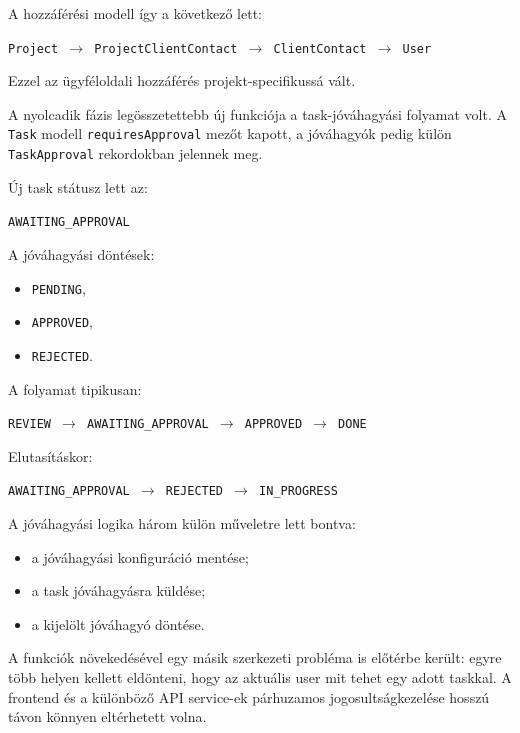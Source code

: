 \documentclass[11pt,a4paper]{report}
\begin{document}
    A hozzáférési modell így a következő lett:

    \begin{center}
        \texttt{Project $\rightarrow$ ProjectClientContact
            $\rightarrow$ ClientContact $\rightarrow$ User}
    \end{center}

    Ezzel az ügyféloldali hozzáférés projekt-specifikussá vált.

    A nyolcadik fázis legösszetettebb új funkciója a task-jóváhagyási folyamat
    volt. A \texttt{Task} modell \texttt{requiresApproval} mezőt kapott, a
    jóváhagyók pedig külön \texttt{TaskApproval} rekordokban jelennek meg.

    Új task státusz lett az:
    \begin{center}
        \texttt{AWAITING\_APPROVAL}
    \end{center}

    A jóváhagyási döntések:
    \begin{itemize}
        \item \texttt{PENDING},
        \item \texttt{APPROVED},
        \item \texttt{REJECTED}.
    \end{itemize}

    A folyamat tipikusan:
    \begin{center}
        \texttt{REVIEW $\rightarrow$ AWAITING\_APPROVAL
            $\rightarrow$ APPROVED $\rightarrow$ DONE}
    \end{center}

    Elutasításkor:
    \begin{center}
        \texttt{AWAITING\_APPROVAL $\rightarrow$ REJECTED
            $\rightarrow$ IN\_PROGRESS}
    \end{center}

    A jóváhagyási logika három külön műveletre lett bontva:
    \begin{itemize}
        \item a jóváhagyási konfiguráció mentése;
        \item a task jóváhagyásra küldése;
        \item a kijelölt jóváhagyó döntése.
    \end{itemize}

    A funkciók növekedésével egy másik szerkezeti probléma is előtérbe került:
    egyre több helyen kellett eldönteni, hogy az aktuális user mit tehet egy adott
    taskkal. A frontend és a különböző API service-ek párhuzamos
    jogosultságkezelése hosszú távon könnyen eltérhetett volna.
\end{document}
